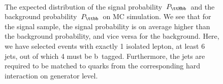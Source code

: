 \begin{figure}
\begin{centering}
\\
\caption{The expected distribution of the signal probability~$P_{\ttHbb}$~and the background probability~$P_{\ttbb}$~on MC simulation. We see that for the signal sample, the signal probability is on average higher than the background probability, and vice versa for the background. Here, we have selected events with exactly 1 isolated lepton, at least 6 jets, out of which 4 must be b~tagged. Furthermore, the jets are required to be matched to quarks from the corresponding hard interaction on generator level.}
\label{fig:mem_proba}
\end{centering}
\end{figure}


